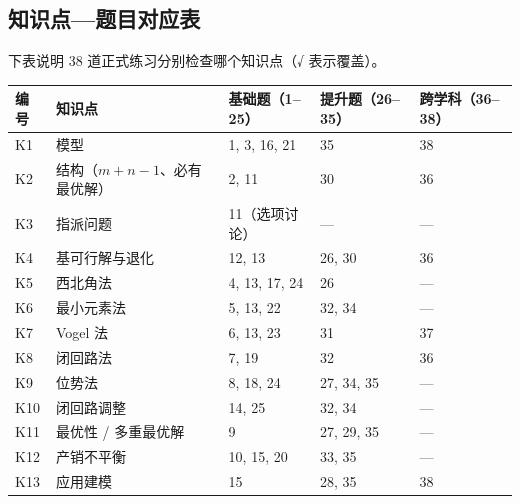 \subsection*{知识点—题目对应表}
下表说明 38 道正式练习分别检查哪个知识点（√ 表示覆盖）。
\begin{center}\small
\begin{tabularx}{\linewidth}{@{}l l X X l@{}}
\toprule
编号 & 知识点 & 基础题（1--25） & 提升题（26--35） & 跨学科（36--38）\\
\midrule
K1 & 模型 & 1, 3, 16, 21 & 35 & 38\\
K2 & 结构（$m+n-1$、必有最优解） & 2, 11 & 30 & 36\\
K3 & 指派问题 & 11（选项讨论） & — & —\\
K4 & 基可行解与退化 & 12, 13 & 26, 30 & 36\\
K5 & 西北角法 & 4, 13, 17, 24 & 26 & —\\
K6 & 最小元素法 & 5, 13, 22 & 32, 34 & —\\
K7 & Vogel 法 & 6, 13, 23 & 31 & 37\\
K8 & 闭回路法 & 7, 19 & 32 & 36\\
K9 & 位势法 & 8, 18, 24 & 27, 34, 35 & —\\
K10 & 闭回路调整 & 14, 25 & 32, 34 & —\\
K11 & 最优性 / 多重最优解 & 9 & 27, 29, 35 & —\\
K12 & 产销不平衡 & 10, 15, 20 & 33, 35 & —\\
K13 & 应用建模 & 15 & 28, 35 & 38\\
\bottomrule
\end{tabularx}
\end{center}

